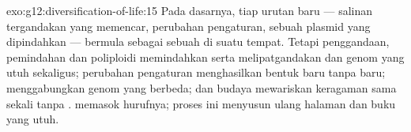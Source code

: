 \begin{solution}{exo:g12:diversification-of-life:15}
Pada dasarnya, tiap urutan baru --- salinan tergandakan yang memencar,
perubahan pengaturan,  sebuah plasmid yang dipindahkan --- bermula
sebagai sebuah  di suatu tempat. Tetapi penggandaan, pemindahan
dan poliploidi memindahkan serta melipatgandakan  dan genom yang
utuh sekaligus; perubahan pengaturan menghasilkan bentuk baru tanpa
 baru;  menggabungkan genom  yang berbeda; dan
budaya mewariskan keragaman sama sekali tanpa .  memasok
hurufnya; proses ini menyusun ulang halaman dan buku yang utuh.
\end{solution}

